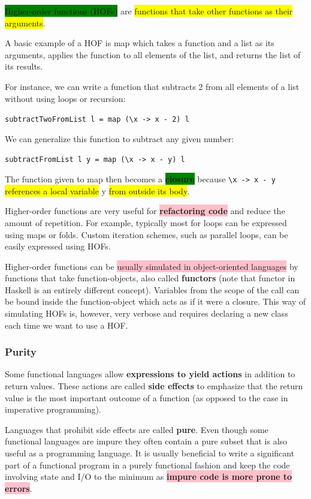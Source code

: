 \documentclass[tikz,border=10pt]{project_plan}
\begin{document}
\colorbox{green}{Higher-order functions (HOFs)} are \colorbox{yellow}{functions that take other functions as their
  arguments}.

A basic example of a HOF is map which takes a function and a list
as its arguments, applies the function to all elements of the list, and returns
the list of its results.

For instance, we can write a function that subtracts 2 from all elements of a
list without using loops or recursion:

\lstinline[]|subtractTwoFromList l = map (\x -> x - 2) l|

We can generalize this function to subtract any given number:

\lstinline[]|subtractFromList l y = map (\x -> x - y) l|

The function given to map then becomes a \colorbox{green}{\textbf{closure}} because \lstinline[]|\x -> x - y|
\colorbox{yellow}{references a local variable} y \colorbox{yellow}{from outside its body}.

Higher-order functions are very useful for \colorbox{pink}{\textbf{refactoring code}} and reduce the
amount of repetition. For example, typically most for loops can be expressed
using maps or folds. Custom iteration schemes, such as parallel loops,
can be easily expressed using HOFs.

Higher-order functions can be \colorbox{pink}{usually simulated in object-oriented
  languages} by functions that take function-objects, also called \textbf{functors}
(note that functor in Haskell is an entirely different concept). Variables
from the scope of the call can be bound inside the function-object which acts
as if it were a closure. This way of simulating HOFs is, however, very
verbose and requires declaring a new class each time we want to use a HOF.

\subsubsection{Purity}

Some functional languages allow \textbf{expressions to yield actions} in
addition to return values. These actions are called \textbf{side effects} to
emphasize that the return value is the most important outcome of a function
(as opposed to the case in imperative programming).

Languages that prohibit side effects are called \textbf{pure}. Even though
some functional languages are impure they often contain a pure subset that
is also useful as a programming language. It is usually beneficial to
write a significant part of a functional program in a purely functional
fashion and keep the code involving state and I/O to the minimum as
\colorbox{pink}{\textbf{impure code is more prone to errors}}.
\end{document}
